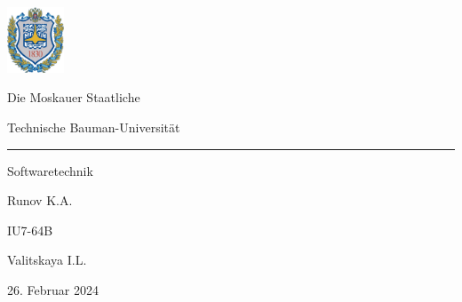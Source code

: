 \documentclass{beamer}
\begin{document}
\begingroup
{}
\begin{frame}
\begin{center}
    \begin{minipage}{0.1\textwidth}
        \includegraphics[width=1.7cm]{img/bmstu_logo.jpg}
    \end{minipage}
    \hfill
    \begin{minipage}{0.80\textwidth}
        {
            Die Moskauer Staatliche

            Technische Bauman-Universit\"at
        }
    \end{minipage}
\end{center}
\rule[3ex]{\linewidth}{1pt}

\begin{center}
    \huge Softwaretechnik
\end{center}

\vfill

\begin{flushright}
    \begin{minipage}{0.4\textwidth}
         Runov K.A.

         IU7-64B

         Valitskaya I.L.
    \end{minipage}
\end{flushright}

\vfill

\begin{center}
    26. Februar 2024
\end{center}

\end{frame}
\endgroup
\end{document}
